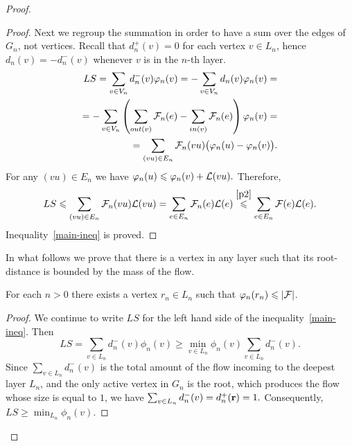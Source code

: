 \documentclass[12pt,oneside,a4paper]{amsart}
\begin{document}
\begin{proof}
\begin{proof}
            Next we regroup the summation in order to have a sum over the edges of $G_n$, not vertices.
            Recall that $d_n^{+}(v) = 0$ for each vertex $v \in L_n$,
              hence $d_n(v) = -d_n^{-}(v)$ whenever $v$ is in the $n$-th layer.
            \begin{align*}
              LS = \sum_{v \in V_n} d_n^{-}(v) \varphi_n(v) = -\sum\limits_{v \in V_n} d_n(v) \varphi_n(v) =\\
              =-\sum_{v \in V_n} \left(\sum_{out(v)} \mathcal{F}_{n}(e) - \sum_{in(v)}\mathcal{F}_{n}(e) \right) \varphi_n(v)=\\
              =\sum_{(vu) \in E_n} \mathcal{F}_{n}(vu) \big(\varphi_n(u) - \varphi_n(v)\big).
            \end{align*}
            For any $(vu) \in E_n$ we have $\varphi_n(u) \leqslant \varphi_n(v) + \mathcal{L}(vu).$
            Therefore,
            \[
              LS\leqslant\sum_{(vu) \in E_n} \mathcal{F}_{n}(vu) \mathcal{L}(vu)= \sum_{e \in E_n} \mathcal{F}_{n}(e) \mathcal{L}(e) \overset{\ref{p2}}{\leqslant} \sum_{e \in E_n} \mathcal{F}(e) \mathcal{L}(e).
            \]
            Inequality~\eqref{main-ineq} is proved.
          \end{proof}

          In what follows we prove that there is a vertex in any layer such that its root-distance is bounded by the mass of the flow.
          \begin{prop}
            \label{prop36}
            For each $n > 0$ there exists a vertex $r_n \in L_n$ such that $\varphi_n(r_n) \leqslant \lvert\mathcal{F}\rvert$.
          \end{prop}
          \begin{proof}
            We continue to write $LS$ for the left hand side of the inequality~\eqref{main-ineq}.
            Then
            \[
              LS = \sum_{v \in L_n}d^{-}_n(v) \phi_n(v) \geq \min_{v \in L_n}\phi_n(v) \sum_{v \in L_n} d^{-}_n(v).
            \]
            Since $\sum_{v \in L_n} d^{-}_n(v)$ is the total amount of the flow incoming to the deepest layer $L_n$, and the only
              active vertex in $G_n$ is the root, which produces the flow whose size is equal to $1$, we have $\sum_{v \in L_n} d^{-}_n(v) = d^{+}_n(\mathbf{r}) = 1.$
            Consequently, $LS \geq \min_{L_n} \phi_n(v).$


\end{proof}
\end{proof}
\end{document}
